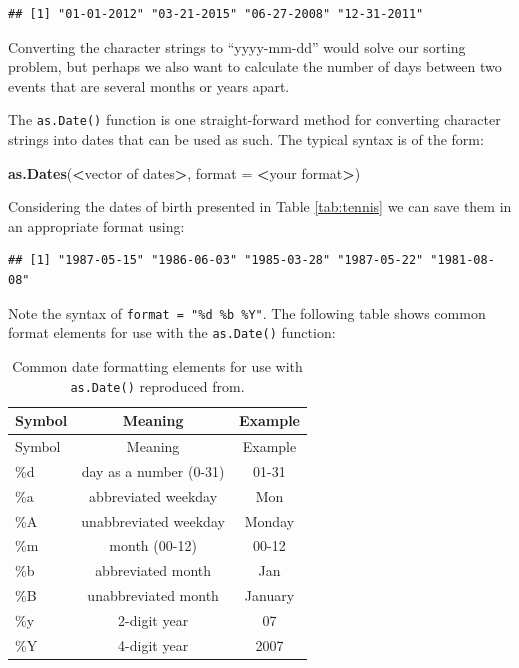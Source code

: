\documentclass[12pt,]{krantz}
\newenvironment{Shaded}{\begin{snugshade}}{\end{snugshade}}
\newcommand{\KeywordTok}[1]{\textcolor[rgb]{0.27,0.27,0.27}{\textbf{#1}}}
\newcommand{\DataTypeTok}[1]{\textcolor[rgb]{0.27,0.27,0.27}{#1}}
\newcommand{\StringTok}[1]{\textcolor[rgb]{0.5,0.5,0.5}{#1}}
\newcommand{\OperatorTok}[1]{\textcolor[rgb]{0.43,0.43,0.43}{\textbf{#1}}}
\newcommand{\NormalTok}[1]{#1}
\begin{document}
\begin{verbatim}
## [1] "01-01-2012" "03-21-2015" "06-27-2008" "12-31-2011"
\end{verbatim}

Converting the character strings to ``yyyy-mm-dd'' would solve our
sorting problem, but perhaps we also want to calculate the number of
days between two events that are several months or years apart.

The \texttt{as.Date()} function is one straight-forward method for
converting character strings into dates that can be used as such. The
typical syntax is of the form:

\begin{Shaded}
\begin{Highlighting}[]
\KeywordTok{as.Dates}\NormalTok{(}\OperatorTok{<}\NormalTok{vector of dates}\OperatorTok{>}\NormalTok{, }\DataTypeTok{format =} \OperatorTok{<}\NormalTok{your format}\OperatorTok{>}\NormalTok{)}
\end{Highlighting}
\end{Shaded}

Considering the dates of birth presented in Table \ref{tab:tennis} we
can save them in an appropriate format using:

\begin{Shaded}
\end{Shaded}

\begin{verbatim}
## [1] "1987-05-15" "1986-06-03" "1985-03-28" "1987-05-22" "1981-08-08"
\end{verbatim}

Note the syntax of \texttt{format\ =\ "\%d\ \%b\ \%Y"}. The following
table shows common format elements for use with the \texttt{as.Date()}
function:

\begin{longtable}[]{@{}lcc@{}}
\caption{\label{tab:dateFormats} Common date formatting elements for use
with \texttt{as.Date()} reproduced from.
}\tabularnewline
\toprule
Symbol & Meaning & Example\tabularnewline
\midrule
\endfirsthead
\toprule
Symbol & Meaning & Example\tabularnewline
\midrule
\endhead
\%d & day as a number (0-31) & 01-31\tabularnewline
\%a & abbreviated weekday & Mon\tabularnewline
\%A & unabbreviated weekday & Monday\tabularnewline
\%m & month (00-12) & 00-12\tabularnewline
\%b & abbreviated month & Jan\tabularnewline
\%B & unabbreviated month & January\tabularnewline
\%y & 2-digit year & 07\tabularnewline
\%Y & 4-digit year & 2007\tabularnewline
\bottomrule
\end{longtable}
\end{document}
